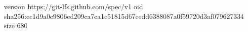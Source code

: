 version https://git-lfs.github.com/spec/v1
oid sha256:ec1d9a0c9806ed209ca7ca1c51815d67cedd6388087a0f59720d3af079627334
size 680
